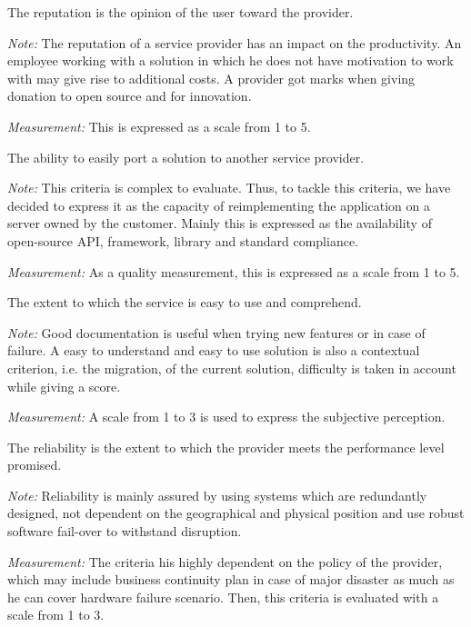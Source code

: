 \documentclass[a4paper,11pt]{article}
\begin{document}
\begin{description}[parsep=10pt,listparindent=\parindent,labelindent=\parindent,font=$\bullet$\ ]
  \item[Reputation:] The reputation is the opinion of the user toward the provider.
    \par \emph{Note:} The reputation of a service provider has an impact on the productivity. An employee working with a solution in which he does not have motivation to work with may give rise to additional costs. A provider got marks when giving donation to open source and for innovation.
    \par \emph{Measurement:} This is expressed as a scale from 1 to 5.
    
  \item[Portability:] The ability to easily port a solution to another service provider.
    \par \emph{Note:} This criteria is complex to evaluate. Thus, to tackle this criteria, we have decided to express it as the capacity of reimplementing the application on a server owned by the customer. Mainly this is expressed as the availability of open-source API, framework, library and standard compliance.
    \par \emph{Measurement:} As a quality measurement, this is expressed as a scale from 1 to 5.

  \item[Usability:] The extent to which the service is easy to use and comprehend.
    \par \emph{Note:} Good documentation is useful when trying new features or in case of failure. A easy to understand and easy to use solution is also a contextual criterion, i.e. the migration, of the current solution, difficulty is taken in account while giving a score.
    \par \emph{Measurement:} A scale from 1 to 3 is used to express the subjective perception.

  \item[Reliability:] The reliability is the extent to which the provider meets the performance level promised.
    \par \emph{Note:} Reliability is mainly assured by using systems which are redundantly designed, not dependent on the geographical and physical position and use robust software fail-over to withstand disruption.
    \par \emph{Measurement:} The criteria his highly dependent on the policy of the provider, which may include business continuity plan in case of major disaster as much as he can cover hardware failure scenario. Then, this criteria is evaluated with a scale from 1 to 3.


\end{description}
\end{document}
